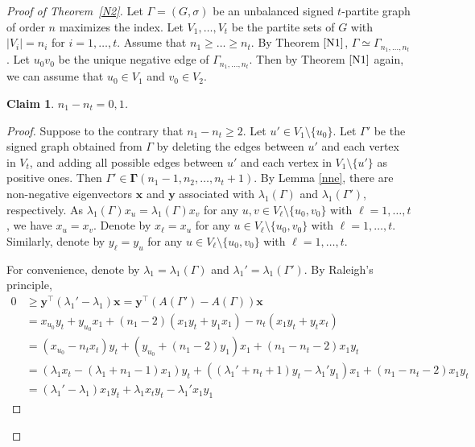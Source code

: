 \documentclass[12pt]{article}
\numberwithin{equation}{section}
\newtheorem {Claim} {Claim}[section]
\begin{document}

\begin{proof}[Proof of Theorem~\ref{N2}]
Let $\Gamma=(G,\sigma)$ be an unbalanced signed $t$-partite graph of order $n$  maximizes the index. 
Let $V_1, \dots, V_t$ be the partite sets of $G$ with  $|V_i|=n_i$ for $i=1,\dots, t$. Assume that $n_1\ge \dots\ge n_t$. 
By Theorem $\ref{N1}$, $\Gamma\simeq \Gamma_{n_1, \dots, n_t}$. 
Let $u_0v_0$ be the unique negative edge of $\Gamma_{n_1, \dots, n_t}$. 
Then by Theorem $\ref{N1}$ again, we can assume that  $u_0\in V_1$ and $v_0\in V_2$. 

\begin{Claim}\label{turan}
$n_1-n_t=0,1$.
\end{Claim}

\begin{proof}
Suppose to the contrary that $n_1-n_t\ge 2$. 
Let $u'\in V_1\setminus\{u_0\}$. 
Let $\Gamma'$ be the signed graph obtained from $\Gamma$ by deleting the edges between $u'$ and each vertex in $V_t$, and adding all possible edges between $u'$ and each vertex in $V_1\setminus\{u'\}$ as positive ones. 
Then $\Gamma'\in \boldsymbol\Gamma (n_1-1, n_2, \dots, n_t+1)$. 
By Lemma \ref{nne}, there are non-negative eigenvectors  $\mathbf{x}$ and $\mathbf{y}$ associated with $\lambda_1(\Gamma)$ and $\lambda_1(\Gamma')$,  respectively. 
As $\lambda_1(\Gamma)x_u=\lambda_1(\Gamma)x_v$ for any $u, v\in V_\ell\setminus\{u_0, v_0\}$ with $\ell=1, \dots, t$, we have $x_u=x_v$. 
Denote by $x_\ell=x_u$ for any $u\in V_\ell\setminus\{u_0, v_0\}$ with $\ell=1, \dots, t$. 
Similarly, denote by $y_\ell=y_u$ for any $u\in V_\ell\setminus\{u_0, v_0\}$ with $\ell=1, \dots, t$. 

For convenience, denote by $\lambda_1=\lambda_1(\Gamma)$ and $\lambda_1'=\lambda_1(\Gamma')$. 
By Raleigh's principle, 
\begin{align*}
0& \ge\mathbf{y}^\top(\lambda_1'-\lambda_1)\mathbf{x} =\mathbf{y}^\top(A(\Gamma')-A(\Gamma))\mathbf{x}\\
& =x_{u_0}y_t+y_{u_0}x_1+(n_1-2)(x_1y_t+y_1x_1)-n_t(x_1y_t+y_tx_t)\\
& =(x_{u_0}-n_tx_t)y_t+(y_{u_0}+(n_1-2)y_1)x_1+(n_1-n_t-2)x_1y_t\\
& =(\lambda_1x_t-(\lambda_1+n_1-1)x_1)y_t+((\lambda_1'+n_t+1)y_t-\lambda_1'y_1)x_1+(n_1-n_t-2)x_1y_t\\
& =(\lambda_1'-\lambda_1)x_1y_t+\lambda_1x_ty_t-\lambda_1'x_1y_1
\end{align*}


\end{proof}
\end{proof}
\end{document}
